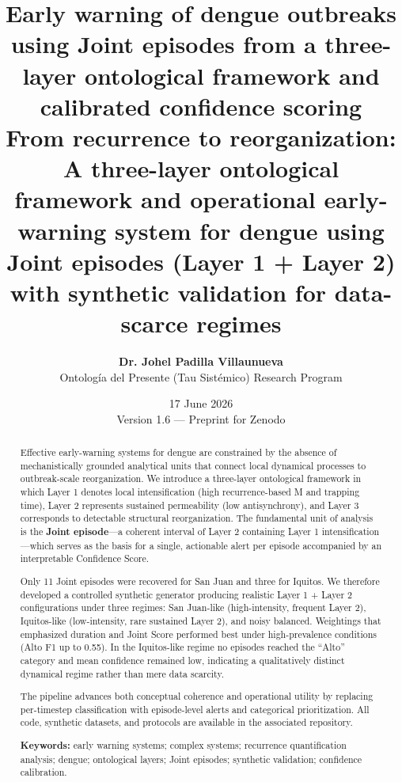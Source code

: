 \documentclass[11pt,a4paper]{article}
\title{\textbf{Early warning of dengue outbreaks using Joint episodes from a three-layer ontological framework and calibrated confidence scoring}\\[0.35em]
\large From recurrence to reorganization: A three-layer ontological framework and operational early-warning system for dengue using Joint episodes (Layer 1 + Layer 2) with synthetic validation for data-scarce regimes}
\author{
    \textbf{Dr. Johel Padilla Villaunueva} \\[0.25em]
    \small Ontolog\'ia del Presente (Tau Sist\'emico) Research Program
}
\date{17 June 2026 \\ \small Version 1.6 — Preprint for Zenodo}
\begin{document}
\maketitle

\begin{abstract}
\noindent Effective early-warning systems for dengue are constrained by the absence of mechanistically grounded analytical units that connect local dynamical processes to outbreak-scale reorganization. We introduce a three-layer ontological framework in which Layer 1 denotes local intensification (high recurrence-based M and trapping time), Layer 2 represents sustained permeability (low antisynchrony), and Layer 3 corresponds to detectable structural reorganization. The fundamental unit of analysis is the \textbf{Joint episode}—a coherent interval of Layer 2 containing Layer 1 intensification—which serves as the basis for a single, actionable alert per episode accompanied by an interpretable Confidence Score.

Only 11 Joint episodes were recovered for San Juan and three for Iquitos. We therefore developed a controlled synthetic generator producing realistic Layer 1 + Layer 2 configurations under three regimes: San Juan-like (high-intensity, frequent Layer 2), Iquitos-like (low-intensity, rare sustained Layer 2), and noisy balanced. Weightings that emphasized duration and Joint Score performed best under high-prevalence conditions (Alto F1 up to 0.55). In the Iquitos-like regime no episodes reached the ``Alto'' category and mean confidence remained low, indicating a qualitatively distinct dynamical regime rather than mere data scarcity.

The pipeline advances both conceptual coherence and operational utility by replacing per-timestep classification with episode-level alerts and categorical prioritization. All code, synthetic datasets, and protocols are available in the associated repository.

\vspace{0.2em}
\noindent\textbf{Keywords:} early warning systems; complex systems; recurrence quantification analysis; dengue; ontological layers; Joint episodes; synthetic validation; confidence calibration.
\end{abstract}
\end{document}
